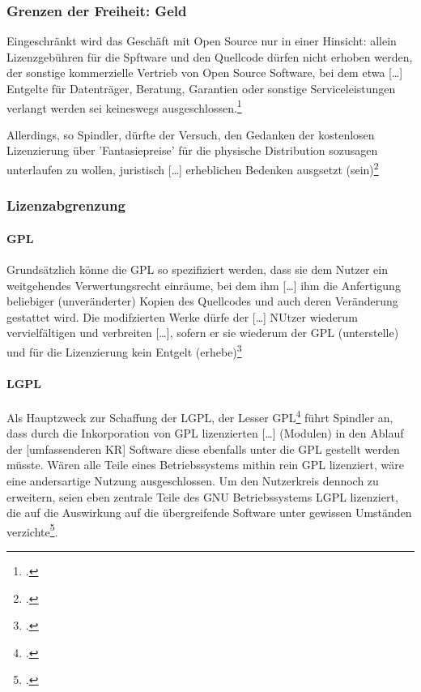 \documentclass[DIV=calc,BCOR=5mm,11pt,headings=small,oneside,abstract=true, toc=bib]{scrartcl}
\begin{document}
\subsubsection{Grenzen der Freiheit: Geld}

Eingeschränkt wird das Geschäft mit Open Source nur in einer Hinsicht:
\glqq{}allein Lizenzgebühren für die Spftware und den Quellcode dürfen
nicht erhoben werden\grqq{}, der sonstige kommerzielle Vertrieb von Open Source
Software, bei dem etwa \glqq{}[\ldots] Entgelte für Datenträger, Beratung,
Garantien oder sonstige Serviceleistungen verlangt werden\grqq{} sei keineswegs
ausgeschlossen.\footcite[vgl.][5]{Spindler2004a}

Allerdings, so Spindler, dürfte der Versuch, den Gedanken der kostenlosen
Lizenzierung über 'Fantasiepreise' für die \glqq{}physische Distribution\grqq{}
sozusagen \glqq{}unterlaufen\grqq{} zu wollen, juristisch \glqq{}[\ldots]
erheblichen Bedenken ausgsetzt (sein)\grqq{}\footcite[vgl.][6]{Spindler2004a}

\subsubsection{Lizenzabgrenzung}

\paragraph{GPL}

Grundsätzlich könne die GPL so spezifiziert werden, dass sie dem Nutzer ein
weitgehendes Verwertungsrecht einräume, bei dem ihm \glqq{}[\ldots] ihm
die Anfertigung beliebiger (unveränderter) Kopien des Quellcodes und auch
deren Veränderung gestattet wird\grqq{}. Die modifzierten Werke dürfe der
\glqq{}[\ldots] NUtzer wiederum vervielfältigen und verbreiten [\ldots],
sofern er sie wiederum der GPL (unterstelle) und für die Lizenzierung
kein Entgelt (erhebe)\grqq{}\footcite[vgl.][9]{Spindler2004a}

\paragraph{LGPL}

Als Hauptzweck zur \glqq{}Schaffung der LGPL\grqq{}, der \glqq{}Lesser
GPL\grqq{}\footcite[vgl.][10]{Spindler2004a} führt Spindler an, dass durch die
\glqq{}Inkorporation\grqq{} von GPL lizenzierten \glqq{}[\ldots] (Modulen) in
den Ablauf der [umfassenderen KR] Software diese ebenfalls unter die GPL
gestellt werden müsste\grqq{}. Wären alle Teile eines Betriebssystems mithin
rein GPL lizenziert, wäre eine andersartige Nutzung ausgeschlossen. Um den
Nutzerkreis dennoch zu erweitern, seien eben zentrale Teile des GNU
Betriebssystems LGPL lizenziert, die auf die Auswirkung auf die übergreifende
Software unter gewissen Umständen verzichte\footcite[vgl.][11]{Spindler2004a}.
\end{document}
